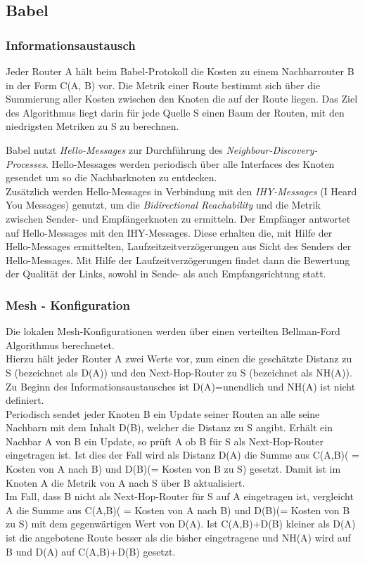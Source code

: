 \documentclass[10pt]{scrartcl}
\begin{document}
\subsection{Babel}
\subsubsection{Informationsaustausch}
Jeder Router A hält beim Babel-Protokoll die Kosten zu einem Nachbarrouter B in der Form C(A, B) vor. Die Metrik einer Route bestimmt sich über die Summierung aller Kosten zwischen den Knoten die auf der Route liegen. Das Ziel des Algorithmus liegt darin für jede Quelle S einen Baum der Routen, mit den niedrigsten Metriken zu S zu berechnen.

Babel nutzt \textit{Hello-Messages} zur Durchführung des \textit{Neighbour-Discovery-Processes}.
Hello-Messages werden periodisch über alle Interfaces des Knoten gesendet um so die Nachbarknoten zu entdecken.\\
Zusätzlich werden Hello-Messages in Verbindung mit den \textit{IHY-Messages} (I Heard You Messages) genutzt, um die \textit{Bidirectional Reachability} und die Metrik zwischen Sender- und Empfängerknoten zu ermitteln.
Der Empfänger antwortet auf Hello-Messages mit den IHY-Messages. 
Diese erhalten die, mit Hilfe der Hello-Messages ermittelten, Laufzeitzeitverzögerungen aus Sicht des Senders der Hello-Messages.
Mit Hilfe der Laufzeitverzögerungen findet dann die Bewertung der Qualität der Links, sowohl in Sende- als auch Empfangsrichtung statt.



\subsubsection{Mesh - Konfiguration}
Die lokalen Mesh-Konfigurationen werden über einen verteilten Bellman-Ford Algorithmus berechnetet.\\
Hierzu hält jeder Router A zwei Werte vor, zum einen die geschätzte Distanz zu S (bezeichnet als D(A)) und den Next-Hop-Router zu S (bezeichnet als NH(A)). Zu Beginn des Informationsaustausches ist D(A)=unendlich und NH(A) ist nicht definiert.\\
Periodisch sendet jeder Knoten B ein Update seiner Routen an alle seine Nachbarn mit dem Inhalt D(B), welcher die Distanz zu S angibt. Erhält ein Nachbar A von B ein Update, so prüft A ob B für S als Next-Hop-Router eingetragen ist. Ist dies der Fall wird als Distanz D(A) die Summe aus C(A,B)( = Kosten von A nach B) und D(B)(= Kosten von B zu S) gesetzt. Damit ist im Knoten A die Metrik von A nach S über B aktualisiert.\\
Im Fall, dass B nicht als Next-Hop-Router für S auf A eingetragen ist, vergleicht A die Summe aus C(A,B)( = Kosten von A nach B) und D(B)(= Kosten von B zu S) mit dem gegenwärtigen Wert von D(A). Ist C(A,B)+D(B) kleiner als D(A) ist die angebotene Route besser als die bisher eingetragene und NH(A) wird auf B und D(A) auf C(A,B)+D(B) gesetzt.\\
\end{document}
